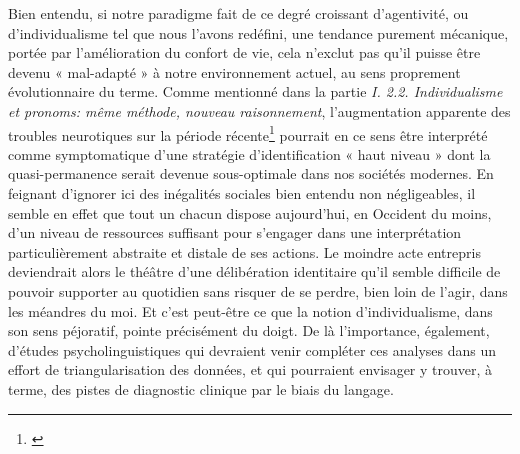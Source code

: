 Bien entendu, si notre paradigme fait de ce degré croissant d’agentivité, ou d'individualisme tel que nous l’avons redéfini, une tendance purement mécanique, portée par l’amélioration du confort de vie, cela n’exclut pas qu’il puisse être devenu  « mal-adapté » à notre environnement actuel, au sens proprement évolutionnaire du terme. Comme mentionné dans la partie \textit{I. 2.2. Individualisme et pronoms: même méthode, nouveau raisonnement}, l’augmentation apparente des troubles neurotiques sur la période récente\footnote{\cite{twenge_age_2000}} pourrait en ce sens être interprété comme symptomatique d’une stratégie d’identification  « haut niveau » dont la quasi-permanence serait devenue sous-optimale dans nos sociétés modernes. En feignant d’ignorer ici des inégalités sociales bien entendu non négligeables, il semble en effet que tout un chacun dispose aujourd'hui, en Occident du moins, d’un niveau de ressources suffisant pour s’engager dans une interprétation particulièrement abstraite et distale de ses actions. Le moindre acte entrepris deviendrait alors le théâtre d’une délibération identitaire qu’il semble difficile de pouvoir supporter au quotidien sans risquer de se perdre, bien loin de l'agir, dans les méandres du moi. Et c’est peut-être ce que la notion d’individualisme, dans son sens péjoratif, pointe précisément du doigt. De là l’importance, également, d’études psycholinguistiques qui devraient venir compléter ces analyses dans un effort de triangularisation des données, et qui pourraient envisager y trouver, à terme, des pistes de diagnostic clinique par le biais du langage. 

